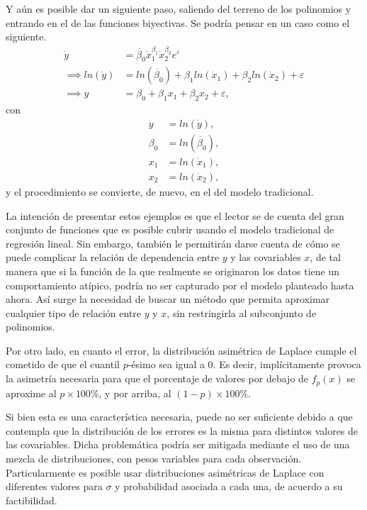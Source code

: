 Y a\'un es posible dar un siguiente paso, saliendo del terreno de los polinomios y entrando en el de las funciones biyectivas. Se podr\'ia pensar en un caso como el siguiente.
\begin{equation*}
\begin{aligned}
    \dot{y} &= \dot{\beta_0}\dot{x}_1^{\beta_1}\dot{x}_2^{\beta_2} e^{\varepsilon} \\
    \implies ln(\dot{y}) &= ln(\dot{\beta_0}) + \beta_1 ln(\dot{x}_1) + \beta_2 ln(\dot{x}_2) + \varepsilon \\
    \implies y &= \beta_0 + \beta_1 x_1 + \beta_2 x_2 + \varepsilon, 
\end{aligned}
\end{equation*}
con
\begin{equation*}
\begin{aligned}
    y &= ln(\dot{y}), \\
    \beta_0 &= ln(\dot{\beta_0}), \\
    x_1 &= ln(\dot{x}_1), \\
    x_2 &= ln(\dot{x}_2),
\end{aligned}
\end{equation*}
y el procedimiento se convierte, de nuevo, en el del modelo tradicional.

La intenci\'on de presentar estos ejemplos es que el lector se de cuenta del gran conjunto de funciones que es posible cubrir usando el modelo tradicional de regresi\'on lineal. Sin embargo, tambi\'en le permitir\'an darse cuenta de c\'omo se puede complicar la relaci\'on de dependencia entre $y$ y las covariables $x$, de tal manera que si la funci\'on de la que realmente se originaron los datos tiene un comportamiento at\'ipico, podr\'ia no ser capturado por el modelo planteado hasta ahora. As\'i surge la necesidad de buscar un m\'etodo que permita aproximar cualquier tipo de relaci\'on entre $y$ y $x$, sin restringirla al subconjunto de polinomios. 

Por otro lado, en cuanto el error, la distribuci\'on asim\'etrica de Laplace cumple el cometido de que el cuantil $p$-\'esimo sea igual a 0. Es decir, impl\'icitamente provoca la asimetr\'ia necesaria para que el porcentaje de valores por debajo de $f_p(x)$ se aproxime al $p \times 100\%$, y por arriba, al $(1-p) \times 100\%$.

Si bien esta es una caracter\'istica necesaria, puede no ser suficiente debido a que contempla que la distribuci\'on de los errores es la misma para distintos valores de las covariables. Dicha problem\'atica podr\'ia ser mitigada mediante el uso de una mezcla de distribuciones, con pesos variables para cada observaci\'on. Particularmente es posible usar distribuciones asim\'etricas de Laplace con diferentes valores para $\sigma$ y probabilidad asociada a cada una, de acuerdo a su factibilidad. 

